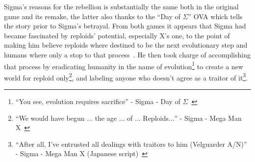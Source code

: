 Sigma's reasons for the rebellion is substantially the same both in the original game and its remake, the latter also thanks to the ``Day of $\Sigma$'' OVA which tells the story prior to Sigma's betrayal. From both games it appears that Sigma had became fascinated by reploids' potential, especially X's one, to the point of making him believe reploids where destined to be the next evolutionary step and humans where only a stop to that process~\cite{X:Manual}. He then took charge of accomplishing that process by eradicating humanity in the name of evolution\footnote{\enquote{You see, evolution requires sacrifice} - Sigma - Day of $\Sigma$~\cite{wiki:Day_of_Sigma_Script}} to create a new world for reploid  only\footnote{\enquote{We would have begun $\dots$ the age $\dots$ of $\dots$ Reploids$\dots$} - Sigma - Mega Man X~\cite{wiki:MMX_script}}, and labeling anyone who doesn't agree as a traitor of it\footnote{\enquote{After all, I’ve entrusted all dealings with traitors to him (Velguarder A/N)} - Sigma - Mega Man X (Japanese script)~\cite{wordpress:X_japanese_script}}.

